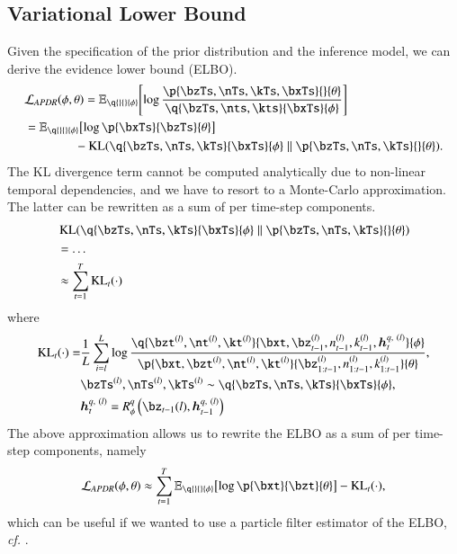 \subsection{Variational Lower Bound}
Given the specification of the prior distribution and the inference model, we can derive the evidence lower bound (ELBO).
\begin{equation}
\begin{aligned}
    &\loss[APDR]{\phi, \theta} = \expc{ \log \frac{ \p{\bzTs, \nTs, \kTs, \bxTs}{}{\theta} }{ \q{\bzTs, \nts, \kts}{\bxTs}{\phi} } }{}{ \q{}{}{\phi} }\\
    &= \expc{ \log \p{\bxTs}{\bzTs}{\theta} }{}{ \q{}{}{\phi} } \\
%    
    &\qquad \qquad - \kl{\q{\bzTs, \nTs, \kTs}{\bxTs}{\phi}}{\p{\bzTs, \nTs, \kTs}{}{\theta}}.
\end{aligned}
\end{equation}
The KL divergence term cannot be computed analytically due to non-linear temporal dependencies, and we have to resort to a Monte-Carlo approximation. The latter can be rewritten as a sum of per time-step components. 
\begin{equation}
\begin{aligned}
    &\kl{\q{\bzTs, \nTs, \kTs}{\bxTs}{\phi}}{\p{\bzTs, \nTs, \kTs}{}{\theta}}\\
%    
    &= \dots\\
%    
    &\approx \sum_{t=1}^T \operatorname{KL}_t(\cdot)
\end{aligned}
\end{equation}
where
\begin{equation}
\begin{aligned}
    \operatorname{KL}_t(\cdot) = &\frac{1}{L} \sum_{i=l}^L \log{\frac{ \q{\bzt^{(l)}, \nt^{(l)}, \kt^{(l)}}{\bxt, \bz_{t-1}^{(l)}, n_{t-1}^{(l)}, k_{t-1}^{(l)}, \bm{h}_t^{q,\ (l)}}{\phi} }{ \p{\bxt, \bzt^{(l)}, \nt^{(l)}, \kt^{(l)}}{\bz_{1:t-1}^{(l)}, n_{1:t-1}^{(l)}, k_{1:t-1}^{(l)}}{\theta} }},\\
%    
    &\bzTs^{(l)}, \nTs^{(l)}, \kTs^{(l)} \sim \q{\bzTs, \nTs, \kTs}{\bxTs}{\phi},\\
%    
    &\bm{h}_t^{q,\ (l)} = R^q_\phi \left( \bz_{t-1}{(l)}, \bm{h}_{t-1}^{q,\ (l)} \right)
\end{aligned}
\end{equation}
The above approximation allows us to rewrite the ELBO as a sum of per time-step components, namely
\begin{equation}
    \loss[APDR]{\phi, \theta} \approx \sum_{t=1}^T \expc{ \log \p{\bxt}{\bzt}{\theta} }{}{ \q{}{}{\phi} } - \operatorname{KL}_t(\cdot),
\end{equation}
which can be useful if we wanted to use a particle filter estimator of the ELBO, \emph{cf.} .